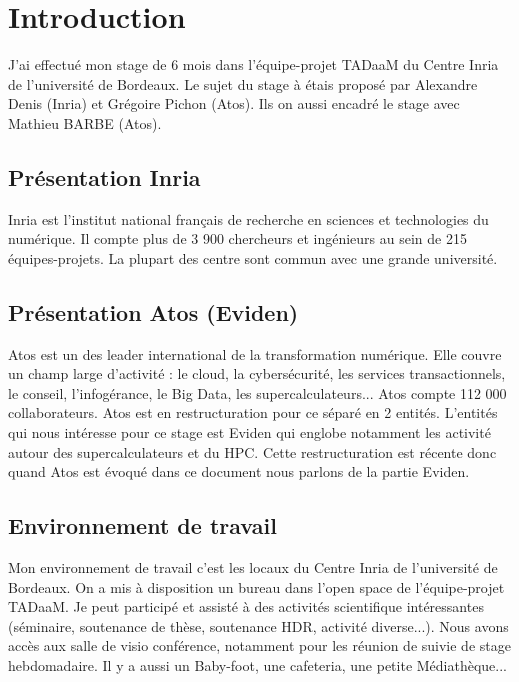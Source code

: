 \section{Introduction}

J'ai effectué mon stage de 6 mois dans l'équipe-projet TADaaM du Centre Inria de l'université de Bordeaux.
Le sujet du stage à étais proposé par Alexandre Denis (Inria) et Grégoire Pichon (Atos).
Ils on aussi encadré le stage avec Mathieu BARBE (Atos).

\subsection{Présentation Inria}

Inria est l'institut national français de recherche en sciences et technologies du numérique.
Il compte plus de 3 900 chercheurs et ingénieurs au sein de 215 équipes-projets.
La plupart des centre sont commun avec une grande université.


\subsection{Présentation Atos (Eviden)}

Atos est un des leader international de la transformation numérique.
Elle couvre un champ large d'activité : le cloud, la cybersécurité, les services transactionnels, le conseil, l'infogérance, le Big Data, les supercalculateurs...
Atos compte 112 000 collaborateurs.
Atos est en restructuration pour ce séparé en 2 entités.
L'entités qui nous intéresse pour ce stage est Eviden qui englobe notamment les activité autour des supercalculateurs et du HPC.
Cette restructuration est récente donc quand Atos est évoqué dans ce document nous parlons de la partie Eviden.


\subsection{Environnement de travail}

Mon environnement de travail c'est les locaux du Centre Inria de l'université de Bordeaux.
On a mis à disposition un bureau dans l'open space de l'équipe-projet TADaaM.
Je peut participé et assisté à des activités scientifique intéressantes (séminaire, soutenance de thèse, soutenance HDR, activité diverse...).
Nous avons accès aux salle de visio conférence, notamment pour les réunion de suivie de stage hebdomadaire.
Il y a aussi un Baby-foot, une cafeteria, une petite Médiathèque...

